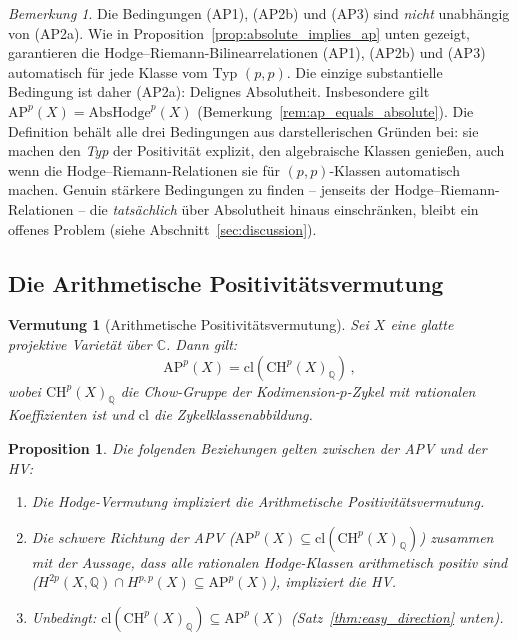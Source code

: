 \documentclass[aps,prd,twocolumn,superscriptaddress,nofootinbib]{revtex4-2}
\newtheorem{proposition}[theorem]{Proposition}
\newtheorem{conjecture}[theorem]{Vermutung}
\theoremstyle{definition}
\theoremstyle{remark}
\newtheorem{remark}[theorem]{Bemerkung}
\begin{document}
\begin{remark}
\label{rem:redundancy}
Die Bedingungen (AP1), (AP2b) und (AP3) sind \textit{nicht} unabhängig von (AP2a). Wie in Proposition~\ref{prop:absolute_implies_ap} unten gezeigt, garantieren die Hodge--Riemann-Bilinearrelationen (AP1), (AP2b) und (AP3) automatisch für jede Klasse vom Typ $(p,p)$. Die einzige substantielle Bedingung ist daher (AP2a): Delignes Absolutheit. Insbesondere gilt $\mathrm{AP}^p(X) = \mathrm{AbsHodge}^p(X)$ (Bemerkung~\ref{rem:ap_equals_absolute}). Die Definition behält alle drei Bedingungen aus darstellerischen Gründen bei: sie machen den \textit{Typ} der Positivität explizit, den algebraische Klassen genießen, auch wenn die Hodge--Riemann-Relationen sie für $(p,p)$-Klassen automatisch machen. Genuin stärkere Bedingungen zu finden -- jenseits der Hodge--Riemann-Relationen -- die \textit{tatsächlich} über Absolutheit hinaus einschränken, bleibt ein offenes Problem (siehe Abschnitt~\ref{sec:discussion}).
\end{remark}

\subsection{Die Arithmetische Positivitätsvermutung}

\begin{conjecture}[Arithmetische Positivitätsvermutung]
\label{conj:AP}
Sei $X$ eine glatte projektive Varietät über $\mathbb{C}$. Dann gilt:
\begin{equation}
\mathrm{AP}^p(X) = \mathrm{cl}\!\left(\mathrm{CH}^p(X)_\mathbb{Q}\right)\,,
\end{equation}
wobei $\mathrm{CH}^p(X)_\mathbb{Q}$ die Chow-Gruppe der Kodimension-$p$-Zykel mit rationalen Koeffizienten ist und $\mathrm{cl}$ die Zykelklassenabbildung.
\end{conjecture}

\begin{proposition}
\label{prop:equivalence}
Die folgenden Beziehungen gelten zwischen der APV und der HV:
\begin{enumerate}
\item Die Hodge-Vermutung impliziert die Arithmetische Positivitätsvermutung.
\item Die \glqq schwere Richtung\grqq{} der APV ($\mathrm{AP}^p(X) \subseteq \mathrm{cl}(\mathrm{CH}^p(X)_\mathbb{Q})$) zusammen mit der Aussage, dass alle rationalen Hodge-Klassen arithmetisch positiv sind ($H^{2p}(X, \mathbb{Q}) \cap H^{p,p}(X) \subseteq \mathrm{AP}^p(X)$), impliziert die HV.
\item Unbedingt: $\mathrm{cl}(\mathrm{CH}^p(X)_\mathbb{Q}) \subseteq \mathrm{AP}^p(X)$ (Satz~\ref{thm:easy_direction} unten).
\end{enumerate}
\end{proposition}
\end{document}
